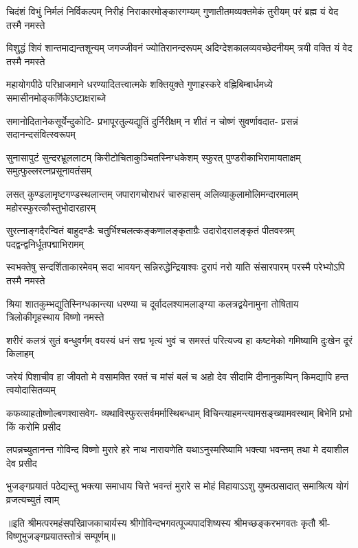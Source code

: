 
\fourlineindentedshloka
{चिदंशं विभुं निर्मलं निर्विकल्पम्‌}
{निरीहं निराकारमोङ्कारगम्यम्‌}
{गुणातीतमव्यक्तमेकं तुरीयम्‌}
{परं ब्रह्म यं वेद तस्मै नमस्ते}%

\fourlineindentedshloka
{विशुद्धं शिवं शान्तमाद्यन्तशून्यम्‌}
{जगज्जीवनं ज्योतिरानन्दरूपम्‌}
{अदिग्देशकालव्यवच्छेदनीयम्‌} 
{त्रयी वक्ति यं वेद तस्मै नमस्ते}%

\fourlineindentedshloka
{महायोगपीठे परिभ्राजमाने} 
{धरण्यादितत्त्वात्मके शक्तियुक्ते}
{गुणाहस्करे वह्निबिम्बार्धमध्ये} 
{समासीनमोङ्कर्णिकेऽष्टाक्षराब्जे}%

\fourlineindentedshloka
{समानोदितानेकसूर्येन्दुकोटि-}
{प्रभापूरतुल्यद्युतिं दुर्निरीक्षम्‌}
{न शीतं न चोष्णं सुवर्णावदात-}
{प्रसन्नं सदानन्दसंवित्स्वरूपम्‌}%

\fourlineindentedshloka
{सुनासापुटं सुन्दरभ्रूललाटम्‌}
{किरीटोचिताकुञ्चितस्निग्धकेशम्‌}
{स्फुरत् पुण्डरीकाभिरामायताक्षम्‌}
{समुत्फुल्लरत्नप्रसूनावतंसम्‌}%

\fourlineindentedshloka
{लसत् कुण्डलामृष्टगण्डस्थलान्तम्‌}
{जपारागचोराधरं चारुहासम्‌}
{अलिव्याकुलामोलिमन्दारमालम्‌}
{महोरस्फुरत्कौस्तुभोदारहारम्‌}%

\fourlineindentedshloka
{सुरत्नाङ्गदैरन्वितं बाहुदण्डैः}
{चतुर्भिश्चलत्कङ्कणालङ्कृताग्रैः}
{उदारोदरालङ्कृतं पीतवस्त्रम्‌}
{पदद्वन्द्वनिर्धूतपद्माभिरामम्‌}%

\fourlineindentedshloka
{स्वभक्तेषु सन्दर्शिताकारमेवम्‌}
{सदा भावयन् सन्निरुद्धेन्द्रियाश्वः}
{दुरापं नरो याति संसारपारम्‌}
{परस्मै परेभ्योऽपि तस्मै नमस्ते}%

\fourlineindentedshloka
{श्रिया शातकुम्भद्युतिस्निग्धकान्त्या}
{धरण्या च दूर्वादलश्यामलाङ्ग्या}
{कलत्रद्वयेनामुना तोषिताय} 
{त्रिलोकीगृहस्थाय विष्णो नमस्ते}%

\fourlineindentedshloka
{शरीरं कलत्रं सुतं बन्धुवर्गम्‌}
{वयस्यं धनं सद्म भृत्यं भुवं च}
{समस्तं परित्यज्य हा कष्टमेको} 
{गमिष्यामि दुःखेन दूरं किलाहम्‌}%

\fourlineindentedshloka
{जरेयं पिशाचीव हा जीवतो मे}
{वसामक्ति रक्तं च मांसं बलं च}
{अहो देव सीदामि दीनानुकम्पिन्}
{किमद्यापि हन्त त्वयोदासितव्यम्‌}%

\fourlineindentedshloka
{कफव्याहतोष्णोल्बणश्वासवेग-}
{व्यथाविस्फुरत्सर्वमर्मास्थिबन्धाम्‌}
{विचिन्त्याहमन्त्यामसङ्ख्यामवस्थाम्}
{बिभेमि प्रभो किं करोमि प्रसीद}%

\fourlineindentedshloka
{लपन्नच्युतानन्त गोविन्द विष्णो}
{मुरारे हरे नाथ नारायणेति}
{यथाऽनुस्मरिष्यामि भक्त्या भवन्तम्‌}
{तथा मे दयाशील देव प्रसीद}%

\fourlineindentedshloka
{भुजङ्गप्रयातं पठेद्यस्तु भक्त्या}
{समाधाय चित्ते भवन्तं मुरारे}
{स मोहं विहायाऽऽशु युष्मत्प्रसादात्}
{समाश्रित्य योगं व्रजत्यच्युतं त्वाम्‌}%

॥इति श्रीमत्परमहंसपरिव्राजकाचार्यस्य श्रीगोविन्दभगवत्पूज्यपादशिष्यस्य 
श्रीमच्छङ्करभगवतः कृतौ श्री-विष्णुभुजङ्गप्रयातस्तोत्रं सम्पूर्णम्‌॥ 

